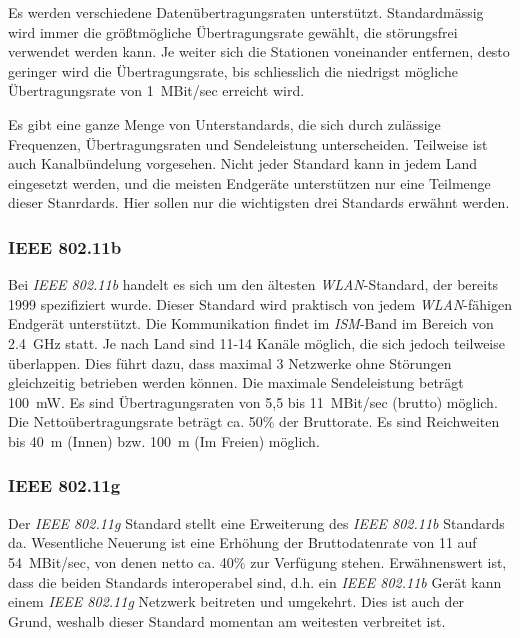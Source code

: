             Es werden verschiedene Datenübertragungsraten unterstützt. Standardmässig wird
            immer die größtmögliche Übertragungsrate gewählt, die störungsfrei verwendet
            werden kann. Je weiter sich die Stationen voneinander entfernen, desto geringer
            wird die Übertragungsrate, bis schliesslich die niedrigst mögliche Übertragungsrate von
            1~MBit/sec erreicht wird.

            Es gibt eine ganze Menge von Unterstandards, die sich durch zulässige Frequenzen, 
            Übertragungsraten und Sendeleistung unterscheiden. Teilweise ist auch Kanalbündelung 
            vorgesehen. Nicht jeder Standard kann in jedem Land eingesetzt werden, und die meisten
            Endgeräte unterstützen nur eine Teilmenge dieser Stanrdards. Hier sollen nur die
            wichtigsten drei Standards erwähnt werden.

        \subsubsection{IEEE 802.11b}
            Bei \emph{IEEE 802.11b} handelt es sich um den ältesten \emph{WLAN}-Standard, der bereits 1999 
            spezifiziert wurde. Dieser Standard wird praktisch von jedem \emph{WLAN}-fähigen 
            Endgerät unterstützt. Die Kommunikation findet im \emph{ISM}-Band im Bereich von 2.4~GHz
            statt. Je nach Land sind 11-14 Kanäle möglich, die sich jedoch teilweise überlappen.
            Dies führt dazu, dass maximal 3 Netzwerke ohne Störungen gleichzeitig betrieben werden
            können. Die maximale Sendeleistung beträgt 100~mW. Es sind Übertragungsraten von 
            5,5 bis 11~MBit/sec (brutto) möglich. Die Nettoübertragungsrate beträgt ca. 50\% der
            Bruttorate. Es sind Reichweiten bis 40~m (Innen) bzw. 100~m (Im Freien) möglich\cite{WirelessNetworking}.

        \subsubsection{IEEE 802.11g}
            Der \emph{IEEE 802.11g} Standard stellt eine Erweiterung des \emph{IEEE 802.11b} Standards da.
            Wesentliche Neuerung ist eine Erhöhung der Bruttodatenrate von 11 auf 54~MBit/sec,
            von denen netto ca. 40\% zur Verfügung stehen. Erwähnenswert ist, dass die
            beiden Standards interoperabel sind, d.h. ein \emph{IEEE 802.11b} Gerät kann einem
            \emph{IEEE 802.11g} Netzwerk beitreten und umgekehrt. Dies ist auch der Grund, weshalb
            dieser Standard momentan am weitesten verbreitet ist.

